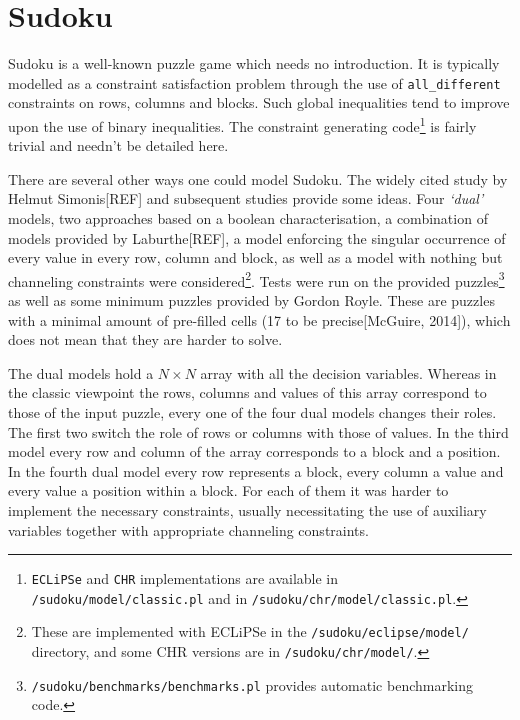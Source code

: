 \section{Sudoku}

Sudoku\cite{article:test} is a well-known puzzle game which needs no introduction. It is typically modelled as a constraint satisfaction problem through the use of \texttt{all\_different} constraints on rows, columns and blocks. Such global inequalities tend to improve upon the use of binary inequalities. The constraint generating code\footnote{\texttt{ECLiPSe} and \texttt{CHR} implementations are available in \texttt{/sudoku/model/classic.pl} and in \texttt{/sudoku/chr/model/classic.pl}.} is fairly trivial and needn't be detailed here. \\\par

There are several other ways one could model Sudoku. The widely cited study by Helmut Simonis[REF] and subsequent studies provide some ideas. Four \textit{`dual'} models, two approaches based on a boolean characterisation, a combination of models provided by Laburthe[REF], a model enforcing the singular occurrence of every value in every row, column and block, as well as a model with nothing but channeling constraints were considered\footnote{These are implemented with ECLiPSe in the \texttt{/sudoku/eclipse/model/} directory, and some CHR versions are in \texttt{/sudoku/chr/model/}.}. Tests were run on the provided puzzles\footnote{\texttt{/sudoku/benchmarks/benchmarks.pl} provides automatic benchmarking code.} as well as some minimum puzzles provided by Gordon Royle. These are puzzles with a minimal amount of pre-filled cells (17 to be precise[McGuire, 2014]), which does not mean that they are harder to solve. \\\par

The dual models hold a $N\times N$ array with all the decision variables. Whereas in the classic viewpoint the rows, columns and values of this array correspond to those of the input puzzle, every one of the four dual models changes their roles. The first two switch the role of rows or columns with those of values. In the third model every row and column of the array corresponds to a block and a position. In the fourth dual model every row represents a block, every column a value and every value a position within a block. For each of them it was harder to implement the necessary constraints, usually necessitating the use of auxiliary variables together with appropriate channeling constraints.\\\par  

